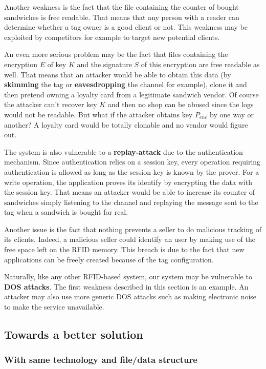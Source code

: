 \documentclass[a4paper,11pt,oneside]{article}
\begin{document}
Another weakness is the fact that the file containing the counter of bought
sandwiches is free readable. That means that any person with a reader can
determine whether a tag owner is a good client or not. This weakness may be
exploited by competitors for example to target new potential clients.  

An even more serious problem may be the fact that files containing the
encryption $E$ of key $K$ and the signature $S$ of this encryption are free
readable as well. That means that an attacker would be able to obtain this data
(by \textbf{skimming} the tag or \textbf{eavesdropping} the channel for
example), clone it and then pretend owning a loyalty card from a legitimate
sandwich vendor. Of course the attacker can't recover key $K$ and then no shop can
be abused since the logs would not be readable. But what if the attacker obtains
key $P_{enc}$ by one way or another? A loyalty card would be totally clonable
and no vendor would figure out. 

The system is also vulnerable to a \textbf{replay-attack} due to the
authentication mechanism. Since authentication relies on a session key, every
operation requiring authentication is allowed as long as the session key is
known by the prover. For a write operation, the application proves its identify
by encrypting the data with the session key. That means an attacker would be
able to increase its counter of sandwiches simply listening to the channel and
replaying the message sent to the tag when a sandwich is bought for real. 

Another issue is the fact that nothing prevents a seller to do malicious
tracking of its clients. Indeed, a malicious seller could identify an user by
making use of the free space left on the RFID memory. This breach is due to the
fact that new applications can be freely created because of the tag
configuration. 

Naturally, like any other RFID-based system, our system may be vulnerable to
\textbf{DOS attacks}. The first weakness described in this section is an
example. An attacker may also use more generic DOS attacks such as making
electronic noise to make the service unavailable. 

\newpage
\subsection{Towards a better solution}

\subsubsection{With same technology and file/data structure}
\end{document}
